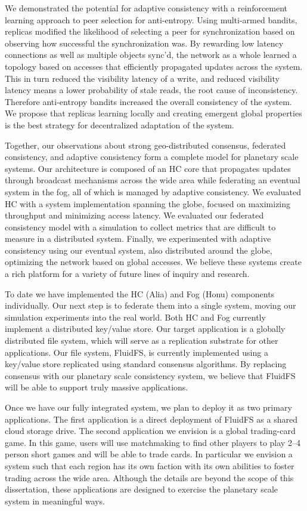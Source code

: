 We demonstrated the potential for adaptive consistency with a reinforcement learning approach to peer selection for anti-entropy.
Using multi-armed bandits, replicas modified the likelihood of selecting a peer for synchronization based on observing how successful the synchronization was.
By rewarding low latency connections as well as multiple objects sync'd, the network as a whole learned a topology based on accesses that efficiently propagated updates across the system.
This in turn reduced the visibility latency of a write, and reduced visibility latency means a lower probability of stale reads, the root cause of inconsistency.
Therefore anti-entropy bandits increased the overall consistency of the system.
We propose that replicas learning locally and creating emergent global properties is the best strategy for decentralized adaptation of the system.

Together, our observations about strong geo-distributed consensus, federated consistency, and adaptive consistency form a complete model for planetary scale systems.
Our architecture is composed of an HC core that propagates updates through broadcast mechanisms across the wide area while federating an eventual system in the fog, all of which is managed by adaptive consistency.
We evaluated HC with a system implementation spanning the globe, focused on maximizing throughput and minimizing access latency.
We evaluated our federated consistency model with a simulation to collect metrics that are difficult to measure in a distributed system.
Finally, we experimented with adaptive consistency using our eventual system, also distributed around the globe, optimizing the network based on global accesses.
We believe these systems create a rich platform for a variety of future lines of inquiry and research.

To date we have implemented the HC (Alia) and Fog (Honu) components individually.
Our next step is to federate them into a single system, moving our simulation experiments into the real world.
Both HC and Fog currently implement a distributed key/value store.
Our target application is a globally distributed file system, which will serve as a replication substrate for other applications.
Our file system, FluidFS, is currently implemented using a key/value store replicated using standard consensus algorithms.
By replacing consensus with our planetary scale consistency system, we believe that FluidFS will be able to support truly massive applications.

Once we have our fully integrated system, we plan to deploy it as two primary applications.
The first application is a direct deployment of FluidFS as a shared cloud storage drive.
The second application we envision is a global trading-card game.
In this game, users will use matchmaking to find other players to play 2--4 person short games and will be able to trade cards.
In particular we envision a system such that each region has its own faction with its own abilities to foster trading across the wide area.
Although the details are beyond the scope of this dissertation, these applications are designed to exercise the planetary scale system in meaningful ways.

